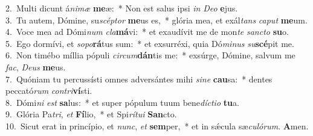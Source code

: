 {2.~}Multi dicunt á\textit{ni}\textit{mæ} \textbf{me}æ:~* Non est salus ipsi \textit{in} \textit{De}\textit{o} \textbf{e}jus.\\
{3.~}Tu autem, Dómine, su\textit{scép}\textit{tor} \textbf{me}us es,~* glória mea, et exál\textit{tans} \textit{ca}\textit{put} \textbf{me}um.\\
{4.~}Voce mea ad Dómi\textit{num} \textit{cla}\textbf{má}vi:~* et exaudívit me de mon\textit{te} \textit{san}\textit{cto} \textbf{su}o.\\
{5.~}Ego dormívi, et \textit{so}\textit{po}\textbf{rá}tus sum:~* et exsurréxi, quia Dó\textit{mi}\textit{nus} \textit{su}\textbf{scé}pit me.\\
{6.~}Non timébo míllia pópuli \textit{cir}\textit{cum}\textbf{dán}tis me:~* exsúrge, Dómine, salvum me \textit{fac}, \textit{De}\textit{us} \textbf{me}us.\\
{7.~}Quóniam tu percussísti omnes adversántes mihi \textit{si}\textit{ne} \textbf{cau}sa:~* dentes peccató\textit{rum} \textit{con}\textit{tri}\textbf{ví}sti.\\
{8.~}Dómi\textit{ni} \textit{est} \textbf{sa}lus:~* et super pópulum tuum bene\textit{dí}\textit{cti}\textit{o} \textbf{tu}a.\\
{9.~}Glória Pa\textit{tri}, \textit{et} \textbf{Fí}lio,~* et Spi\textit{rí}\textit{tu}\textit{i} \textbf{San}cto.\\
{10.~}Sicut erat in princípio, et \textit{nunc}, \textit{et} \textbf{sem}per,~* et in sǽcula sæ\textit{cu}\textit{ló}\textit{rum}. \textbf{A}men.\\
